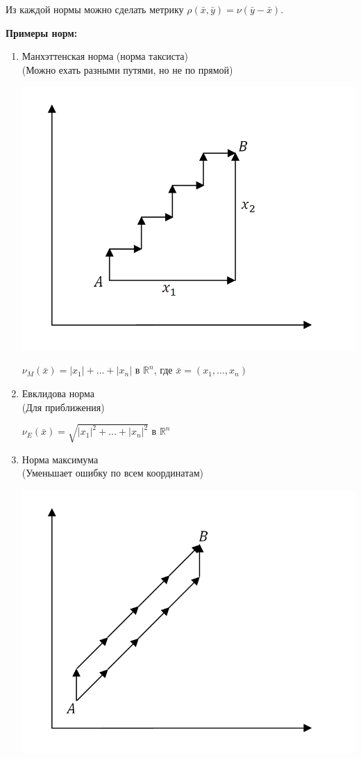 \begin{notice}Из каждой нормы можно сделать метрику $\rho(\bar x, \bar y) = \nu(\bar y - \bar x)$.
\end{notice}
\textbf{Примеры норм:}\begin{enumerate}
    \item Манхэттенская норма (норма таксиста)\\
    (Можно ехать разными путями, но не по прямой)\begin{center}
        \includegraphics[scale=0.4]{l4_7.png}\end{center}
    \begin{center}$\nu_M(\bar x) = |x_1|+...+|x_n|$ в $\mathbb{R}^n$, где $\bar x = (x_1,..., x_n)$\end{center}
    \item Евклидова норма\\
    (Для приближения)
    \begin{center}
        $\nu_E(\bar x) = \sqrt{|x_1|^2+...+|x_n|^2}$ в $\mathbb{R}^n$\end{center}
    \item Норма максимума\\
    (Уменьшает ошибку по всем координатам)\begin{center}
        \includegraphics[scale=0.4]{l4_8.png}\end{center}

\end{enumerate}
